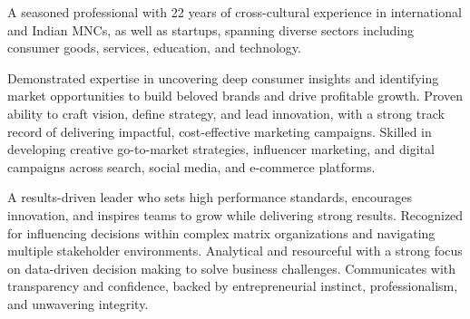
\par{
A seasoned professional with 22 years of cross-cultural experience in international and Indian MNCs, as well as startups, spanning diverse sectors including consumer goods, services, education, and technology.

Demonstrated expertise in uncovering deep consumer insights and identifying market opportunities to build beloved brands and drive profitable growth. Proven ability to craft vision, define strategy, and lead innovation, with a strong track record of delivering impactful, cost-effective marketing campaigns. Skilled in developing creative go-to-market strategies, influencer marketing, and digital campaigns across search, social media, and e-commerce platforms.  

A results-driven leader who sets high performance standards, encourages innovation, and inspires teams to grow while delivering strong results. Recognized for influencing decisions within complex matrix organizations and navigating multiple stakeholder environments. Analytical and resourceful with a strong focus on data-driven decision making to solve business challenges. Communicates with transparency and confidence, backed by entrepreneurial instinct, professionalism, and unwavering integrity.
}
